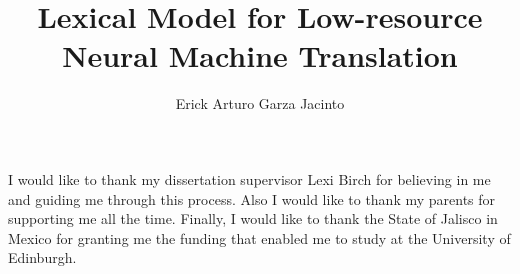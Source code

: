 \documentclass[msc,logo,12pt,A4]{infthesis}  %
\title{Lexical Model for Low-resource Neural Machine Translation}
\author{Erick Arturo Garza Jacinto}
\begin{document}
\begin{preliminary}

\maketitle
\begin{acknowledgements}
I would like to thank my dissertation supervisor Lexi Birch for believing in me and guiding me through this process. Also I would like to thank my parents for supporting me all the time.
Finally, I would like to thank the State of Jalisco in Mexico for granting me the funding that enabled me to study at the University of Edinburgh.
\end{acknowledgements}

\standarddeclaration


\tableofcontents
 



\end{preliminary}






%

%






\end{document}
